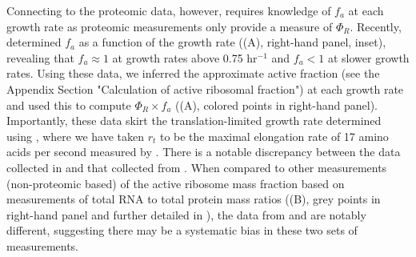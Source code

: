 Connecting  to the proteomic data, however, requires knowledge of $f_a$ at each growth rate as proteomic
measurements only provide a measure of $\Phi_R$. Recently, \cite{dai2016}
determined $f_a$ as a function of the growth rate ((A),
right-hand panel, inset), revealing that $f_a \approx 1$ at growth rates above
0.75 hr$^{-1}$ and $f_a < 1$ at slower growth rates. Using these data, we
inferred the approximate active fraction (see the Appendix Section "Calculation
of active ribosomal fraction") at each growth rate and used this to compute
$\Phi_R \times f_a$ ((A), colored points in right-hand
panel). Importantly, these data skirt the translation-limited growth rate
determined using , where we have taken $r_t$ to be the maximal
elongation rate of 17 amino acids per second measured by \cite{dai2016}. There
is a notable discrepancy between the data collected in \cite{schmidt2016,
li2014} and that collected from \cite{valgepea2013, peebo2015}. When compared to
other measurements (non-proteomic based) of the active ribosome mass fraction
based on measurements of total RNA to total protein mass ratios
((B), grey points in right-hand panel and  further detailed
in ), the data from
\cite{valgepea2013} and \cite{peebo2015} are notably different, suggesting there
may be a systematic bias in these two sets of measurements.



